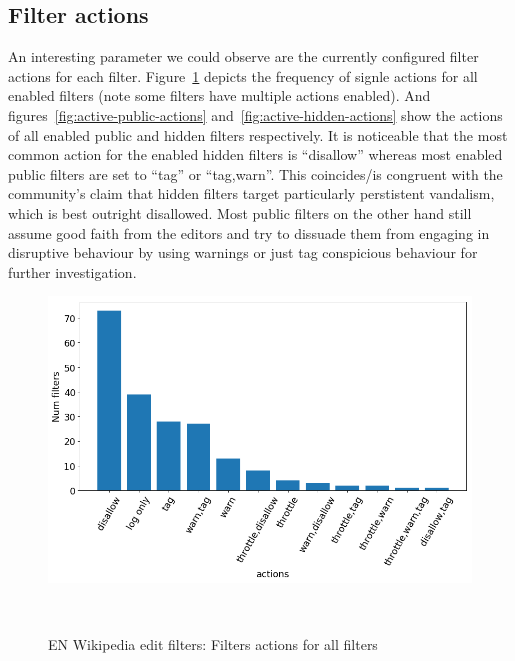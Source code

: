 \subsection{Filter actions}
An interesting parameter we could observe are the currently configured filter actions for each filter.
Figure~\ref{fig:all-active-filters-actions} depicts the frequency of signle actions for all enabled filters (note some filters have multiple actions enabled).
And figures~\ref{fig:active-public-actions} and~\ref{fig:active-hidden-actions} show the actions of all enabled public and hidden filters respectively.
It is noticeable that the most common action for the enabled hidden filters is ``disallow'' whereas most enabled public filters are set to ``tag'' or ``tag,warn''.
This coincides/is congruent with the community's claim that hidden filters target particularly perstistent vandalism, which is best outright disallowed.
Most public filters on the other hand still assume good faith from the editors and try to dissuade them from engaging in disruptive behaviour by using warnings or just tag conspicious behaviour for further investigation.

\begin{figure}
\centering
  \includegraphics[width=0.9\columnwidth]{pics/all-active-filters-actions.png}
  \caption{EN Wikipedia edit filters: Filters actions for all filters}~\label{fig:all-active-filters-actions}
\end{figure}


